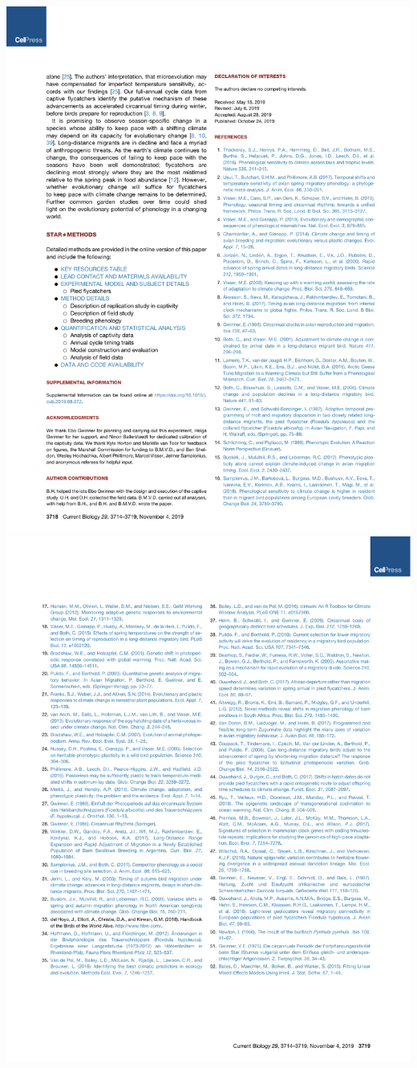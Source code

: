 \documentclass[a4paper, twoside]{templates/ociamthesis}
\begin{document}
\includegraphics[width=1\linewidth]{pdf_chapters/pied/pied_crop_Part05}
\includegraphics[width=1\linewidth]{pdf_chapters/pied/pied_crop_Part06}
\end{document}
